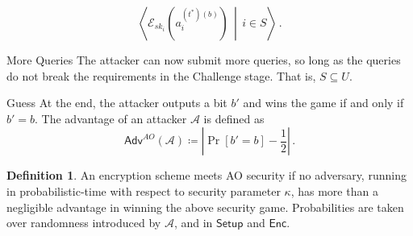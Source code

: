 \documentclass[10pt,letterpaper,oneside,twocolumn,journal]{IEEEtran}
\theoremstyle{definition}
\newtheorem{definition}{Definition}[section]
\theoremstyle{definition}
\theoremstyle{remark}
\begin{document}
\begin{LaTeXdescription}
    \begin{equation*}
        \left\langle\mathcal{E}_{sk_i}(a^{(t^*)(b)}_i)\,\middle|\,i\in S\right\rangle\,.
    \end{equation*}
    \item[More Queries] The attacker can now submit more queries, so long as the queries do not break the requirements in the Challenge stage. That is, $S \subseteq U$.
    \item[Guess] At the end, the attacker outputs a bit $b'$ and wins the game if and only if $b' = b$. The advantage of an attacker $\mathcal{A}$ is defined as
    \begin{equation*}
        \mathsf{Adv}^{AO}(\mathcal{A}) \coloneqq \left\lvert \Pr [b'=b] - \frac{1}{2}\right\rvert\,.
    \end{equation*} 
\end{LaTeXdescription}

\begin{definition}
    An encryption scheme meets AO security if no adversary, running in probabilistic-time with respect to security parameter $\kappa$, has more than a negligible advantage in winning the above security game. Probabilities are taken over randomness introduced by $\mathcal{A}$, and in $\mathsf{Setup}$ and $\mathsf{Enc}$.
\end{definition}


\ifCLASSOPTIONcaptionsoff
  \newpage
\fi





\end{document}
